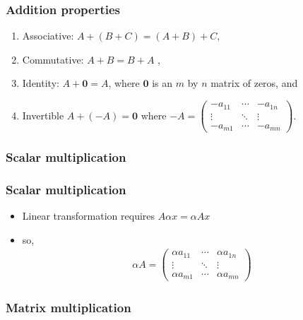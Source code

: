 \documentclass[compress]{beamer}
\newcommand{\gmatrix}[1]{\begin{pmatrix} {#1}_{11} & \cdots &
    {#1}_{1n} \\ \vdots & \ddots & \vdots \\ {#1}_{m1} & \cdots &
    {#1}_{mn} \end{pmatrix}}
\begin{document}
\begin{frame}
  \frametitle{Addition properties}
  \begin{enumerate}
  \item Associative: $A+(B + C) = (A+B) + C$,
  \item Commutative: $A + B = B + A$ ,
  \item Identity: $A + \mathbf{0} = A$, where $\mathbf{0}$ is an $m$ by
    $n$ matrix of zeros, and
  \item Invertible $A + (-A) = \mathbf{0}$ where $-A = \gmatrix{-a}$.
  \end{enumerate}
\end{frame}

\subsubsection{Scalar multiplication}
\begin{frame}
  \frametitle{Scalar multiplication}
  \begin{itemize}
  \item Linear transformation requires $A \alpha x = \alpha A x$
  \item so,
    \begin{align*}
      \alpha A = \begin{pmatrix} \alpha a_{11} & \cdots &
        \alpha a_{1n} \\ \vdots & \ddots & \vdots \\ \alpha a_{m1} & \cdots &
        \alpha a_{mn} \end{pmatrix}
    \end{align*}
  \end{itemize}
\end{frame}

\subsubsection{Matrix multiplication}
\end{document}
